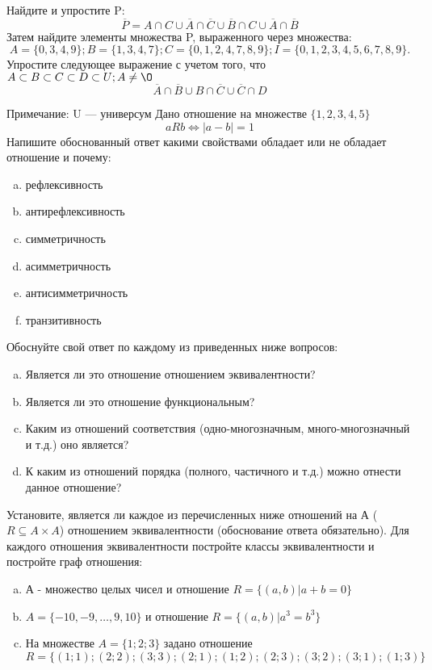 \documentclass[10pt]{exam}
\begin{document}
\begin{questions}
\question
Найдите и упростите P:
\begin{equation*}
\overline{P} = A \cap C \cup \overline{A} \cap \overline{C} \cup \overline{B} \cap C \cup \overline{A} \cap \overline{B}
\end{equation*}
Затем найдите элементы множества P, выраженного через множества:
\begin{equation*}
A = \{0, 3, 4, 9\}; 
B = \{1, 3, 4, 7\};
C = \{0, 1, 2, 4, 7, 8, 9\};
I = \{0, 1, 2, 3, 4, 5, 6, 7, 8, 9\}.
\end{equation*}\question
Упростите следующее выражение с учетом того, что $A\subset B \subset C \subset D \subset U; A \neq \O$
\begin{equation*}
\overline{A} \cap \overline{B} \cup B \cap \overline{C} \cup \overline{C} \cap D
\end{equation*}

Примечание: U — универсум\question
Дано отношение на множестве $\{1, 2, 3, 4, 5\}$ 
\begin{equation*}
aRb \iff |a-b| = 1
\end{equation*}
Напишите обоснованный ответ какими свойствами обладает или не обладает отношение и почему:   
\begin{enumerate} [a)]\setcounter{enumi}{0}
\item рефлексивность
\item антирефлексивность
\item симметричность
\item асимметричность
\item антисимметричность
\item транзитивность
\end{enumerate}

Обоснуйте свой ответ по каждому из приведенных ниже вопросов:
\begin{enumerate} [a)]\setcounter{enumi}{0}
    \item Является ли это отношение отношением эквивалентности?
    \item Является ли это отношение функциональным?
    \item Каким из отношений соответствия (одно-многозначным, много-многозначный и т.д.) оно является?
    \item К каким из отношений порядка (полного, частичного и т.д.) можно отнести данное отношение?
\end{enumerate}

\question
Установите, является ли каждое из перечисленных ниже отношений на А ($R \subseteq A \times A$) отношением эквивалентности (обоснование ответа обязательно). Для каждого отношения эквивалентности 
постройте классы эквивалентности и постройте граф отношения:
\begin{enumerate}[a)]\setcounter{enumi}{0}
\item А - множество целых чисел и отношение $R = \{(a,b)|a + b = 0\}$
\item $A = \{-10, -9, …, 9, 10\}$ и отношение $R = \{(a,b)|a^{3} = b^{3}\}$
\item На множестве $A = \{1; 2; 3\}$ задано отношение $R = \{(1; 1); (2; 2); (3; 3); (2; 1); (1; 2); (2; 3); (3; 2); (3; 1); (1; 3)\}$


\end{enumerate}
\end{questions}
\end{document}
